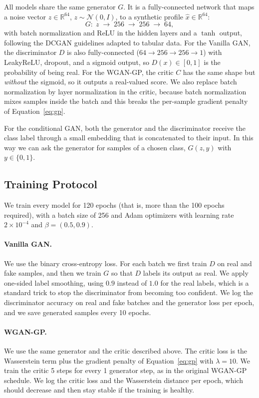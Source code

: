 \documentclass[10pt,twocolumn]{article}
\begin{document}
All models share the same generator $G$. It is a fully-connected network that maps a noise
vector $z\in\mathbb{R}^{64}$, $z\sim\mathcal{N}(0,I)$, to a synthetic profile
$\hat{x}\in\mathbb{R}^{64}$:
\begin{equation}
G:\; z \;\rightarrow\; 256 \;\rightarrow\; 256 \;\rightarrow\; 64,
\label{eq:gen}
\end{equation}
with batch normalization and ReLU in the hidden layers and a $\tanh$ output, following the DCGAN
guidelines adapted to tabular data. For the Vanilla GAN, the discriminator $D$ is also
fully-connected ($64\rightarrow256\rightarrow256\rightarrow1$) with LeakyReLU, dropout, and a
sigmoid output, so $D(x)\in[0,1]$ is the probability of being real. For the WGAN-GP, the critic
$C$ has the same shape but \emph{without} the sigmoid, so it outputs a real-valued score. We also
replace batch normalization by layer normalization in the critic, because batch normalization
mixes samples inside the batch and this breaks the per-sample gradient penalty of
Equation~\eqref{eq:gp}.

For the conditional GAN, both the generator and the discriminator receive the class label
through a small embedding that is concatenated to their input. In this way we can ask the
generator for samples of a chosen class, $G(z,y)$ with $y\in\{0,1\}$.

\subsection{Training Protocol}

We train every model for 120 epochs (that is, more than the 100 epochs required), with a batch
size of 256 and Adam optimizers with learning rate $2\times10^{-4}$ and $\beta=(0.5,0.9)$.

\paragraph{Vanilla GAN.} We use the binary cross-entropy loss. For each batch we first train
$D$ on real and fake samples, and then we train $G$ so that $D$ labels its output as real. We
apply one-sided label smoothing, using $0.9$ instead of $1.0$ for the real labels, which is a
standard trick to stop the discriminator from becoming too confident. We log the discriminator
accuracy on real and fake batches and the generator loss per epoch, and we save generated
samples every 10 epochs.

\paragraph{WGAN-GP.} We use the same generator and the critic described above. The critic loss
is the Wasserstein term plus the gradient penalty of Equation~\eqref{eq:gp} with $\lambda=10$.
We train the critic 5 steps for every 1 generator step, as in the original WGAN-GP schedule. We
log the critic loss and the Wasserstein distance per epoch, which should decrease and then stay
stable if the training is healthy.
\end{document}
